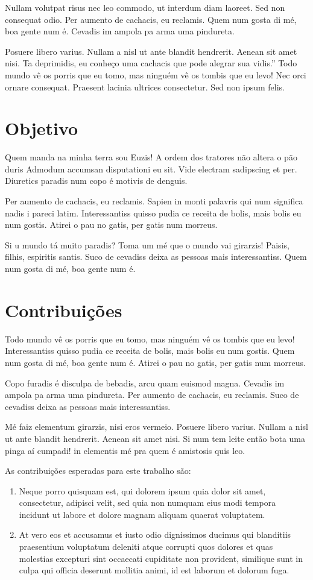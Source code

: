 Nullam volutpat risus nec leo commodo, ut interdum diam laoreet. Sed non consequat odio. Per aumento de cachacis, eu reclamis. Quem num gosta di mé, boa gente num é. Cevadis im ampola pa arma uma pindureta.

Posuere libero varius. Nullam a nisl ut ante blandit hendrerit. Aenean sit amet nisi. Ta deprimidis, eu conheço uma cachacis que pode alegrar sua vidis.” Todo mundo vê os porris que eu tomo, mas ninguém vê os tombis que eu levo! Nec orci ornare consequat. Praesent lacinia ultrices consectetur. Sed non ipsum felis. 

\section{Objetivo}
Quem manda na minha terra sou Euzis! A ordem dos tratores não altera o pão duris Admodum accumsan disputationi eu sit. Vide electram sadipscing et per. Diuretics paradis num copo é motivis de denguis.

Per aumento de cachacis, eu reclamis. Sapien in monti palavris qui num significa nadis i pareci latim. Interessantiss quisso pudia ce receita de bolis, mais bolis eu num gostis. Atirei o pau no gatis, per gatis num morreus.

Si u mundo tá muito paradis? Toma um mé que o mundo vai girarzis! Paisis, filhis, espiritis santis. Suco de cevadiss deixa as pessoas mais interessantiss. Quem num gosta di mé, boa gente num é. 

\section{Contribuições}
Todo mundo vê os porris que eu tomo, mas ninguém vê os tombis que eu levo! Interessantiss quisso pudia ce receita de bolis, mais bolis eu num gostis. Quem num gosta di mé, boa gente num é. Atirei o pau no gatis, per gatis num morreus.

Copo furadis é disculpa de bebadis, arcu quam euismod magna. Cevadis im ampola pa arma uma pindureta. Per aumento de cachacis, eu reclamis. Suco de cevadiss deixa as pessoas mais interessantiss.

Mé faiz elementum girarzis, nisi eros vermeio. Posuere libero varius. Nullam a nisl ut ante blandit hendrerit. Aenean sit amet nisi. Si num tem leite então bota uma pinga aí cumpadi! in elementis mé pra quem é amistosis quis leo. 

As contribui\c{c}\~{o}es esperadas para este trabalho s\~{a}o:

\begin{enumerate}[label=(\roman*)]
\item Neque porro quisquam est, qui dolorem ipsum quia dolor sit amet, consectetur, adipisci velit, sed quia non numquam eius modi tempora incidunt ut labore et dolore magnam aliquam quaerat voluptatem.

\item At vero eos et accusamus et iusto odio dignissimos ducimus qui blanditiis praesentium voluptatum deleniti atque corrupti quos dolores et quas molestias excepturi sint occaecati cupiditate non provident, similique sunt in culpa qui officia deserunt mollitia animi, id est laborum et dolorum fuga.
\end{enumerate}



